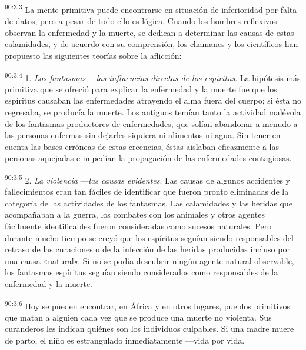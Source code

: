 \par
\textsuperscript{90:3.3} La mente primitiva puede encontrarse en situación de inferioridad por falta de datos, pero a pesar de todo ello es lógica. Cuando los hombres reflexivos observan la enfermedad y la muerte, se dedican a determinar las causas de estas calamidades, y de acuerdo con su comprensión, los chamanes y los científicos han propuesto las siguientes teorías sobre la aflicción:

\par
\textsuperscript{90:3.4} 1. \textit{Los fantasmas} ---\textit{las influencias directas de los espíritus}. La hipótesis más primitiva que se ofreció para explicar la enfermedad y la muerte fue que los espíritus causaban las enfermedades atrayendo el alma fuera del cuerpo; si ésta no regresaba, se producía la muerte. Los antiguos temían tanto la actividad malévola de los fantasmas productores de enfermedades, que solían abandonar a menudo a las personas enfermas sin dejarles siquiera ni alimentos ni agua. Sin tener en cuenta las bases erróneas de estas creencias, éstas aislaban eficazmente a las personas aquejadas e impedían la propagación de las enfermedades contagiosas.

\par
\textsuperscript{90:3.5} 2. \textit{La violencia} ---\textit{las causas evidentes}. Las causas de algunos accidentes y fallecimientos eran tan fáciles de identificar que fueron pronto eliminadas de la categoría de las actividades de los fantasmas. Las calamidades y las heridas que acompañaban a la guerra, los combates con los animales y otros agentes fácilmente identificables fueron consideradas como sucesos naturales. Pero durante mucho tiempo se creyó que los espíritus seguían siendo responsables del retraso de las curaciones o de la infección de las heridas producidas incluso por una causa «natural». Si no se podía descubrir ningún agente natural observable, los fantasmas espíritus seguían siendo considerados como responsables de la enfermedad y la muerte.

\par
\textsuperscript{90:3.6} Hoy se pueden encontrar, en África y en otros lugares, pueblos primitivos que matan a alguien cada vez que se produce una muerte no violenta. Sus curanderos les indican quiénes son los individuos culpables. Si una madre muere de parto, el niño es estrangulado inmediatamente ---vida por vida.

